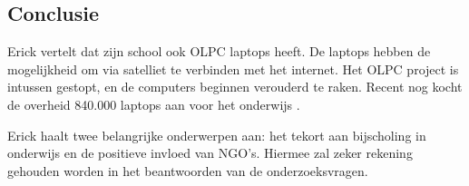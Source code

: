 \subsection{Conclusie}
Erick vertelt dat zijn school ook OLPC laptops heeft. De laptops hebben de mogelijkheid om via satelliet te verbinden met het internet. Het OLPC project is intussen gestopt, en de computers beginnen verouderd te raken. Recent nog kocht de overheid 840.000 laptops aan voor het onderwijs \autocite{Riofrio2020}.

Erick haalt twee belangrijke onderwerpen aan: het tekort aan bijscholing in onderwijs en de positieve invloed van NGO's. Hiermee zal zeker rekening gehouden worden in het beantwoorden van de onderzoeksvragen.